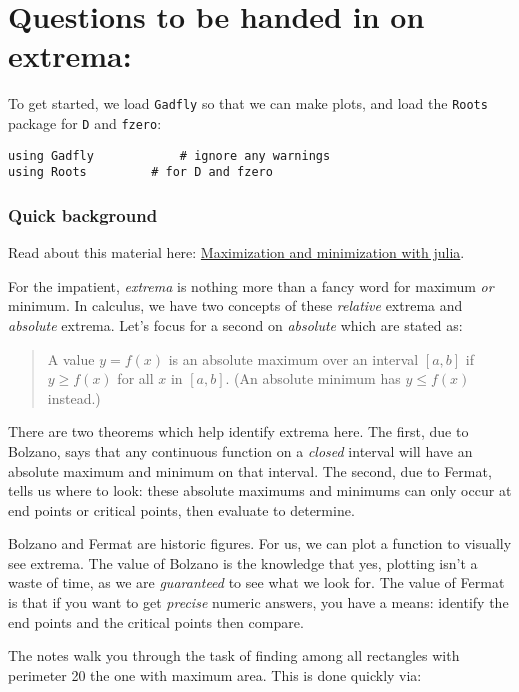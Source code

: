 \documentclass[12pt]{article}
\begin{document}
\section{Questions to be handed in on extrema:}

To get started, we load \texttt{Gadfly} so that we can make plots, and
load the \texttt{Roots} package for \texttt{D} and \texttt{fzero}:



\begin{verbatim}
using Gadfly            # ignore any warnings
using Roots         # for D and fzero
\end{verbatim}
\subsubsection{Quick background}

Read about this material here:
\href{http://mth229.github.io/extrema.html}{Maximization and
minimization with julia}.

For the impatient, \emph{extrema} is nothing more than a fancy word for
maximum \emph{or} minimum. In calculus, we have two concepts of these
\emph{relative} extrema and \emph{absolute} extrema. Let's focus for a
second on \emph{absolute} which are stated as:

\begin{quote}
A value $y=f(x)$ is an absolute maximum over an interval $[a,b]$ if
$y \geq f(x)$ for all $x$ in $[a,b]$. (An absolute minimum has
$y \leq f(x)$ instead.)
\end{quote}

There are two theorems which help identify extrema here. The first, due
to Bolzano, says that any continuous function on a \emph{closed}
interval will have an absolute maximum and minimum on that interval. The
second, due to Fermat, tells us where to look: these absolute maximums
and minimums can only occur at end points or critical points, then
evaluate to determine.

Bolzano and Fermat are historic figures. For us, we can plot a function
to visually see extrema. The value of Bolzano is the knowledge that yes,
plotting isn't a waste of time, as we are \emph{guaranteed} to see what
we look for. The value of Fermat is that if you want to get
\emph{precise} numeric answers, you have a means: identify the end
points and the critical points then compare.

The notes walk you through the task of finding among all rectangles with
perimeter 20 the one with maximum area. This is done quickly via:
\end{document}
